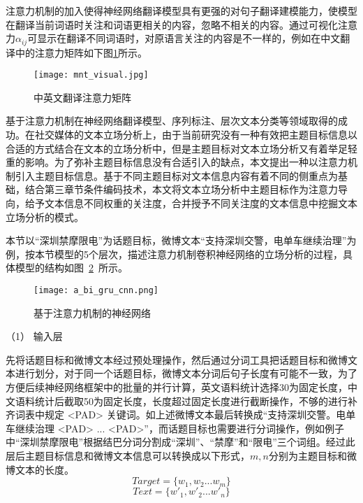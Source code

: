 注意力机制的加入使得神经网络翻译模型具有更强的对句子翻译建模能力，使模型在翻译当前词语时关注和词语更相关的内容，忽略不相关的内容。通过可视化注意力$\alpha_{ij}$可显示在翻译不同词语时，对原语言关注的内容是不一样的，例如在中文翻译中的注意力矩阵如下图\ref{english2china}所示。
\begin{figure}[htbp]
	\centering
	\texttt{[image: mnt\_visual.jpg]}
	\caption[english2china1]{中英文翻译注意力矩阵}
	\label{english2china}
\end{figure}

基于注意力机制在神经网络翻译模型、序列标注、层次文本分类等领域取得的成功。在社交媒体的文本立场分析上，由于当前研究没有一种有效把主题目标信息以合适的方式结合在文本的立场分析中，但是主题目标对文本立场分析又有着举足轻重的影响。为了弥补主题目标信息没有合适引入的缺点，本文提出一种以注意力机制引入主题目标信息。基于不同主题目标对文本信息内容有着不同的侧重点为基础，结合第三章节条件编码技术，本文将文本立场分析中主题目标作为注意力导向，给予文本信息不同权重的关注度，合并授予不同关注度的文本信息中挖掘文本立场分析的模式。


本节以“深圳禁摩限电”为话题目标，微博文本“支持深圳交警，电单车继续治理”为例，按本节模型的5个层次，描述注意力机制卷积神经网络的立场分析的过程，具体模型的结构如图~\ref{GRU_CNN}~所示。

\begin{figure}[htbp]
	\centering
	\texttt{[image: a\_bi\_gru\_cnn.png]}
	\caption[]{基于注意力机制的神经网络}
	\label{GRU_CNN}
\end{figure}

（1） 输入层

先将话题目标和微博文本经过预处理操作，然后通过分词工具把话题目标和微博文本进行划分，对于同一个话题目标，微博文本分词后句子长度有可能不一致，为了方便后续神经网络框架中的批量的并行计算，英文语料统计选择30为固定长度，中文语料统计后截取50为固定长度，长度超过固定长度进行截断操作，不够的进行补齐词表中规定 <PAD> 关键词。如上述微博文本最后转换成“支持深圳交警。电单车继续治理 <PAD> ... <PAD>”，而话题目标也需要进行分词操作，例如例子中“深圳禁摩限电”根据结巴分词分割成“深圳”、“禁摩”和“限电”三个词组。经过此层后主题目标信息和微博文本信息可以转换成以下形式，$m,n$分别为主题目标和微博文本的长度。
\begin{equation}\label{target_info} Target= \lbrace w_1,w_2...w_m\rbrace \end{equation}
\begin{equation}\label{text_info} Text=\lbrace w'_1,w'_2...w'_n\rbrace  \end{equation}


